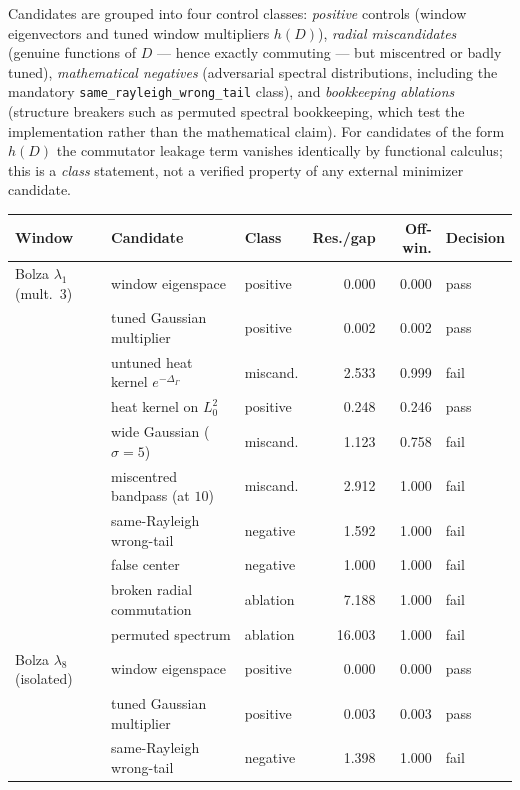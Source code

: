 \documentclass[12pt,a4paper]{article}
\theoremstyle{definition}
\theoremstyle{remark}
\newcommand{\Delop}{\Delta_{\Gamma}}
\begin{document}
Candidates are grouped into four control classes: \emph{positive} controls
(window eigenvectors and tuned window multipliers $h(D)$), \emph{radial
miscandidates} (genuine functions of $D$ --- hence exactly commuting --- but
miscentred or badly tuned), \emph{mathematical negatives} (adversarial
spectral distributions, including the mandatory
\texttt{same\_rayleigh\_}\allowbreak\texttt{wrong\_tail} class), and
\emph{bookkeeping ablations} (structure breakers such as permuted spectral
bookkeeping, which test the implementation rather than the mathematical
claim). For candidates of the form $h(D)$ the commutator leakage term
vanishes identically by functional calculus; this is a \emph{class}
statement, not a verified property of any external minimizer candidate.

\begin{table}[htp]
\centering
\footnotesize
\setlength{\tabcolsep}{4pt}
{\renewcommand{\arraystretch}{1.12}
\begin{tabularx}{\textwidth}{@{}L{2.5cm}YL{1.9cm}rrl@{}}
\toprule
\textbf{Window} & \textbf{Candidate} & \textbf{Class} &
\textbf{Res./gap} & \textbf{Off-win.} & \textbf{Decision} \\
\midrule
Bolza $\lambda_1$ (mult.\ $3$)
  & window eigenspace & positive & 0.000 & 0.000 & pass \\
  & tuned Gaussian multiplier & positive & 0.002 & 0.002 & pass \\
  & untuned heat kernel $e^{-\Delop}$ & miscand. & 2.533 & 0.999 & fail \\
  & heat kernel on $L^2_0$ & positive & 0.248 & 0.246 & pass \\
  & wide Gaussian ($\sigma{=}5$) & miscand. & 1.123 & 0.758 & fail \\
  & miscentred bandpass (at $10$) & miscand. & 2.912 & 1.000 & fail \\
  & same-Rayleigh wrong-tail & negative & 1.592 & 1.000 & fail \\
  & false center & negative & 1.000 & 1.000 & fail \\
  & broken radial commutation & ablation & 7.188 & 1.000 & fail \\
  & permuted spectrum & ablation & 16.003 & 1.000 & fail \\
\midrule
Bolza $\lambda_8$ (isolated)
  & window eigenspace & positive & 0.000 & 0.000 & pass \\
  & tuned Gaussian multiplier & positive & 0.003 & 0.003 & pass \\
  & same-Rayleigh wrong-tail & negative & 1.398 & 1.000 & fail \\

\end{tabularx}}
\end{table}
\end{document}
